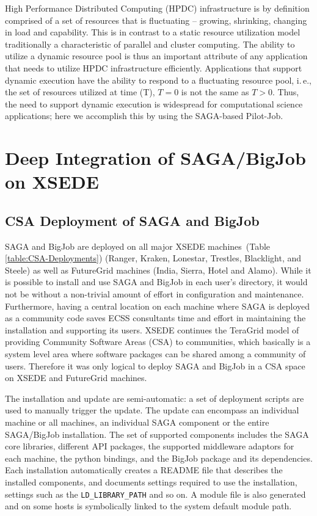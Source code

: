 \documentclass{sig-alternate}
\begin{document}
High Performance Distributed Computing (HPDC) infrastructure is by definition
comprised of a set of resources that is fluctuating -- growing, shrinking,
changing in load and capability. This is in contrast to a static resource
utilization model traditionally a characteristic of parallel and cluster
computing. The ability to utilize a dynamic resource pool is thus an important
attribute of any application that needs to utilize HPDC infrastructure
efficiently. Applications that support dynamic execution have the
ability to respond to a fluctuating resource pool, i.\,e., the set of
resources utilized at time (T), $T=0$ is not the same as $T>0$.  Thus,
the need to support dynamic execution is widespread for computational
science applications; here we accomplish this by using the SAGA-based
Pilot-Job.

\section{Deep Integration of SAGA/BigJob on XSEDE}

\subsection{CSA Deployment of SAGA and BigJob}
 \label{ssec:csa}
 
SAGA and BigJob are deployed on all major XSEDE
machines~(Table \ref{table:CSA-Deployments}) (Ranger,
Kraken, Lonestar, Trestles, Blacklight, and Steele) as well as FutureGrid machines
(India, Sierra, Hotel and Alamo). While it is possible to install and
use SAGA and BigJob in each user's directory, it would not be without a non-trivial amount of effort in configuration and maintenance. Furthermore, having a
central location on each machine where SAGA is deployed as a community code
saves ECSS consultants time and effort in maintaining the installation and
supporting its users. XSEDE continues the TeraGrid model of providing Community
Software Areas (CSA) to communities, which basically is a system
level area where software packages can be shared among a community of users.
Therefore it was only logical to deploy SAGA and BigJob in a CSA space on XSEDE
and FutureGrid machines.

The installation and update are semi-automatic: a set of deployment
scripts are used to manually trigger the update. The update can encompass an
individual machine or all machines, an individual SAGA component or the entire
SAGA/BigJob installation. The set of supported components includes the SAGA core
libraries, different API packages, the supported
middleware adaptors for each machine, the python bindings, and the
BigJob package and its dependencies. Each installation automatically creates a
README file that describes the installed components, and documents settings
required to use the installation, settings such as the
\texttt{LD\_LIBRARY\_PATH} and so on. A module file is also generated and on
some hosts is symbolically linked to the system default module path. 
\end{document}

